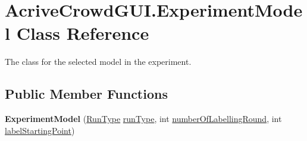 \hypertarget{class_acrive_crowd_g_u_i_1_1_experiment_model}{}\section{Acrive\+Crowd\+G\+U\+I.\+Experiment\+Model Class Reference}
\label{class_acrive_crowd_g_u_i_1_1_experiment_model}


The class for the selected model in the experiment.  


\subsection*{Public Member Functions}
\begin{DoxyCompactItemize}
\item 
\hypertarget{class_acrive_crowd_g_u_i_1_1_experiment_model_aa5107aea3fafae11afc7fbc755bb5e0d}{}{\bfseries Experiment\+Model} (\hyperlink{namespace_crowdsourcing_models_ae187d0e1d9fe64e7ebcb9d948d02d2d0}{Run\+Type} \hyperlink{class_acrive_crowd_g_u_i_1_1_experiment_model_a1f9de8a43c8836d01bb6a0d643677627}{run\+Type}, int \hyperlink{class_acrive_crowd_g_u_i_1_1_experiment_model_ad35017c811ab03b6a31d7cd467badcef}{number\+Of\+Labelling\+Round}, int \hyperlink{class_acrive_crowd_g_u_i_1_1_experiment_model_a3aa0a6773b8ecfb0aca8bb08e57b02ed}{label\+Starting\+Point})\label{class_acrive_crowd_g_u_i_1_1_experiment_model_aa5107aea3fafae11afc7fbc755bb5e0d}


\end{DoxyCompactItemize}
